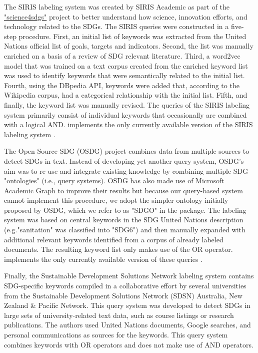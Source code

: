  The SIRIS labeling system \cite[]{duran_silva_nicolau_2019_3567769} was created by SIRIS Academic as part of the  \href{http://science4sdgs.sirisacademic.com/}{"science4sdgs"} project to better understand how science, innovation efforts, and technology related to the SDGs. The SIRIS queries were constructed in a five-step procedure. First, an initial list of keywords was extracted from the United Nations official list of goals, targets and indicators. Second, the list was manually enriched on a basis of a review of SDG relevant literature. Third, a word2vec model that was trained on a text corpus created from the enriched keyword list was used to identify keywords that were semantically related to the initial list. Fourth, using the DBpedia API, keywords were added that, according to the Wikipedia corpus, had a categorical relationship with the initial list. Fifth, and finally, the keyword list was manually revised. The queries of the SIRIS labeling system primarily consist of individual keywords that occasionally are combined with a logical AND.  implements the only currently available version of the SIRIS labeling system \cite[]{duran_silva_nicolau_2019_3567769} . 

The Open Source SDG (OSDG) project combines data from multiple sources to detect SDGs in text. Instead of developing yet another query system, OSDG's aim was to re-use and integrate existing knowledge by combining multiple SDG "ontologies" (i.e., query systems). OSDG has also made use of Microsoft Academic Graph to improve their results but because our query-based system cannot implement this procedure, we adopt the simpler ontology initially proposed by OSDG, which we refer to as "SDGO" in the package. The labeling system was based on central keywords in the SDG United Nations description (e.g."sanitation" was classified into "SDG6") and then manually expanded with additional relevant keywords identified from a corpus of already labeled documents. The resulting keyword list only makes use of the OR operator.  implements the only currently available version of these queries \cite[]{Bautista2019}. 

 Finally, the Sustainable Development Solutions Network \cite[SDSN,][]{sdsn} labeling system contains SDG-specific keywords compiled in a collaborative effort by several universities from the Sustainable Development Solutions Network (SDSN) Australia, New Zealand \& Pacific Network. This query system was developed to detect SDGs in large sets of university-related text data, such as course listings or research publications. The authors used United Nations documents, Google searches, and personal communications as sources for the keywords. This query system combines keywords with OR operators and does not make use of AND operators. 

